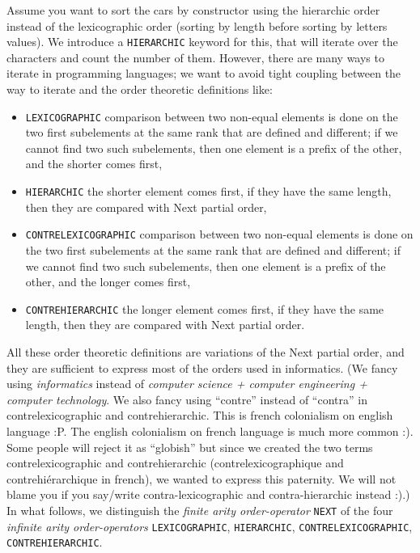 \documentclass[a4paper,11pt]{report}
\begin{document}
Assume you want to sort the cars by constructor using the hierarchic order instead of the lexicographic order
(sorting by length before sorting by letters values).
We introduce a \verb?HIERARCHIC? keyword for this,
that will iterate over the characters and count the number of them.
However, there are many ways to iterate in programming languages;
we want to avoid tight coupling between the way to iterate and the order theoretic definitions like:
\begin{itemize}
\item \verb?LEXICOGRAPHIC? comparison between two non-equal elements is done on the two first subelements
  at the same rank that are defined and different;
  if we cannot find two such subelements, then one element is a prefix of the other,
  and the shorter comes first,
\item \verb?HIERARCHIC? the shorter element comes first,
  if they have the same length, then they are compared with Next partial order,
\item \verb?CONTRELEXICOGRAPHIC? comparison between two non-equal elements is done on the two first subelements
  at the same rank that are defined and different;
  if we cannot find two such subelements, then one element is a prefix of the other,
  and the longer comes first,
\item \verb?CONTREHIERARCHIC? the longer element comes first,
  if they have the same length, then they are compared with Next partial order.
\end{itemize}
All these order theoretic definitions are variations of the Next partial order,
and they are sufficient to express most of the orders used in informatics.
(We fancy using \emph{informatics} instead of \emph{computer science + computer engineering + computer technology}.
We also fancy using ``contre'' instead of ``contra'' in contrelexicographic and contrehierarchic.
This is french colonialism on english language :P.
The english colonialism on french language is much more common :).
Some people will reject it as ``globish'' but since we created the two terms
contrelexicographic and contrehierarchic (contrelexicographique and contrehi\'erarchique in french),
we wanted to express this paternity.
We will not blame you if you say/write contra-lexicographic and contra-hierarchic instead :).)
In what follows, we distinguish the \emph{finite arity order-operator} \verb?NEXT?
of the four \emph{infinite arity order-operators} \verb?LEXICOGRAPHIC?,
 \verb?HIERARCHIC?, \verb?CONTRELEXICOGRAPHIC?, \verb?CONTREHIERARCHIC?.
\end{document}
